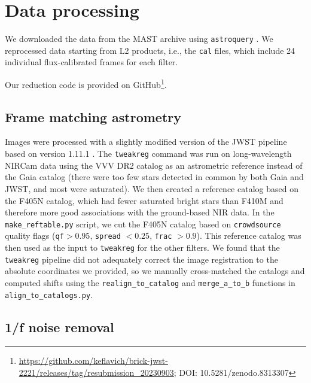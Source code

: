\documentclass[times,astrosymb,twocolumn]{aastex631}
\def\rr#1{#1}
\begin{document}
\section{Data processing}
\label{sec:dataprocessing}

We downloaded the data from the MAST archive using \texttt{astroquery} \citep{Ginsburg2019,Brasseur2020}.
We reprocessed data starting from L2 products, 
i.e., the \texttt{cal} files, which include 24 individual flux-calibrated frames for each filter.

Our reduction code is provided on GitHub\footnote{\url{https://github.com/keflavich/brick-jwst-2221/releases/tag/resubmission_20230903};  DOI: 10.5281/zenodo.8313307}.

\subsection{Frame matching astrometry}
Images were processed with a slightly modified version of the JWST pipeline \rr{based on version 1.11.1 \citep{bushouse_howard_2023_8099867}}.
The \texttt{tweakreg} command was run on long-wavelength NIRCam data using the VVV DR2 catalog \citep{Saito2012} as an astrometric reference instead of the Gaia catalog (there were too few stars detected in common \rr{by both} Gaia and JWST, and most were saturated).
We then created a reference catalog based on the F405N catalog, which had fewer saturated bright stars than F410M and therefore more good associations with the ground-based NIR data. %
In the \texttt{make\_reftable.py} script, we cut the F405N catalog based on \texttt{crowdsource} quality flags (\texttt{qf}$>0.95$, \texttt{spread} $<0.25$, \texttt{frac} $>0.9$).
This reference catalog was then used as the input to \texttt{tweakreg} for the other filters.
We found that the \rr{\texttt{tweakreg}} pipeline did not adequately correct the image registration to the absolute coordinates we provided, so we manually cross-matched the catalogs and computed shifts using the \texttt{realign\_to\_catalog} and \texttt{merge\_a\_to\_b} functions in \texttt{align\_to\_catalogs.py}.


\subsection{1/f noise removal}
\label{sec:oneoverf}
\end{document}
